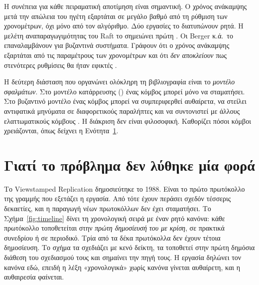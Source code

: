 Η συνέπεια για κάθε πειραματική αποτίμηση είναι σημαντική. Ο χρόνος
ανάκαμψης μετά την απώλεια του ηγέτη εξαρτάται σε μεγάλο βαθμό από τη
ρύθμιση των χρονομέτρων, όχι μόνο από τον αλγόριθμο. Δύο εργασίες το
διατυπώνουν ρητά. Η μελέτη αναπαραγωγιμότητας του Raft το σημειώνει
πρώτη \cite{howard2015raftrefloated}. Οι Berger κ.ά.\ το επαναλαμβάνουν
για βυζαντινά συστήματα. Γράφουν ότι ο χρόνος ανάκαμψης εξαρτάται από τις
παραμέτρους των χρονομέτρων και ότι \emph{δεν αποκλείουν} πως στενότερες
ρυθμίσεις θα ήταν εφικτές \cite{berger2023simulation}.

Η δεύτερη διάσταση που οργανώνει ολόκληρη τη βιβλιογραφία είναι το
\emph{μοντέλο σφαλμάτων}. Στο μοντέλο κατάρρευσης () ένας
κόμβος μπορεί μόνο να σταματήσει. Στο βυζαντινό μοντέλο ένας κόμβος
μπορεί να συμπεριφερθεί αυθαίρετα, να στείλει αντιφατικά μηνύματα σε
διαφορετικούς παραλήπτες και να συντονιστεί με άλλους ελαττωματικούς
κόμβους \cite{lamport1982byzantine}. Η διάκριση δεν είναι φιλοσοφική.
Καθορίζει πόσοι κόμβοι χρειάζονται, όπως δείχνει η
Ενότητα~\ref{sec:notonce}.

\section{Γιατί το πρόβλημα δεν λύθηκε μία φορά}
\label{sec:notonce}

Το Viewstamped Replication δημοσιεύτηκε το 1988. Είναι το πρώτο
πρωτόκολλο της γραμμής που εξετάζει η εργασία. Από τότε έχουν περάσει
σχεδόν τέσσερις δεκαετίες, και η παραγωγή νέων πρωτοκόλλων δεν έχει
σταματήσει. Το Σχήμα~\ref{fig:timeline} δίνει τη χρονολογική σειρά με
έναν ρητό κανόνα: κάθε πρωτόκολλο τοποθετείται στην \emph{πρώτη
δημοσίευσή του με κρίση}, σε πρακτικά συνεδρίου ή σε περιοδικό. Τρία από
τα δέκα πρωτόκολλα δεν έχουν τέτοια δημοσίευση. Το σχήμα τα σχεδιάζει με
κενό δείκτη, τα τοποθετεί στην πρώτη δημόσια διάθεση του σχεδιασμού τους
και σημαίνει την πηγή τους. Η εργασία δηλώνει τον κανόνα εδώ, επειδή η
λέξη «χρονολογικά» χωρίς κανόνα γίνεται αυθαίρετη, και η αυθαιρεσία
φαίνεται.

